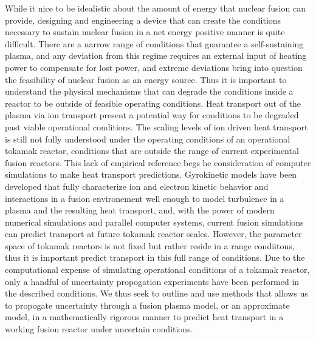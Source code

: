 \documentclass{article}
\begin{document}
While it nice to be idealistic about the amount of energy that nuclear fusion can provide, designing and engineering a device that can create the conditions necessary to sustain nuclear fusion in a net energy positive manner is quite difficult. There are a narrow range of conditions that guarantee a self-sustaining plasma, and any deviation from this regime requires an external input of heating power to compensate for lost power, and extreme deviations bring into question the feasibility of nuclear fusion as an energy source. Thus it is important to understand the physical mechanisms that can degrade the conditions inside a reactor to be outside of feasible operating conditions. Heat transport out of the plasma via ion transport present a potential way for conditions to be degraded past viable operational conditions. The scaling levels of ion driven heat transport is still not fully understood under the operating conditions of an operational  tokamak reactor, conditions that are outside the range of current experimental fusion reactors. This lack of empirical reference begs he consideration of computer simulations to make heat transport predictions. Gyrokinetic models have been developed that fully characterize ion and electron kinetic behavior and interactions in a fusion environement well enough to model turbulence in a plasma and the resulting heat transport, and, with the power of modern numerical simulations and parallel computer systems, current fusion simulations can predict transport at future tokamak reactor scales. However, the parameter space of tokamak reactors is not fixed but rather reside in a range condiitons, thus it is important predict transport in this full range of conditions. Due to the computational expense of simulating operational conditions of a tokamak reactor, only a handful of uncertainty propogation experiments have been performed in the described conditions. We thus seek to outline and use methods that allows us to propogate uncertainty through a fusion plasma model, or an approximate model, in a mathematically rigorous manner to predict heat transport in a working fusion reactor under uncertain conditions.\\
\newpage
\end{document}
